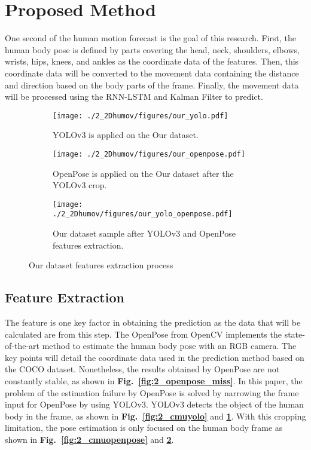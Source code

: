 \section{Proposed Method}\label{2:proposedmethod}
One second of the human motion forecast is the goal of this research. First, the human body pose is defined by parts covering the head, neck, shoulders, elbows, wrists, hips, knees, and ankles as the coordinate data of the features. Then, this coordinate data will be converted to the movement data containing the distance and direction based on the body parts of the frame. Finally, the movement data will be processed using the RNN-LSTM and Kalman Filter to predict.

\begin{figure}
    \centering
    \begin{subfigure}[t]{0.45\textwidth}
        \centering
        \texttt{[image: ./2\_2Dhumov/figures/our\_yolo.pdf]}
        \caption{YOLOv3 is applied on the Our dataset.}
        \label{fig:2_ouryolo}
    \end{subfigure}
    \begin{subfigure}[t]{0.45\textwidth}
        \centering
        \texttt{[image: ./2\_2Dhumov/figures/our\_openpose.pdf]}
        \caption{OpenPose is applied on the Our dataset after the YOLOv3 crop.}
        \label{fig:2_ouropenpose}
    \end{subfigure}
    \begin{subfigure}[t]{0.5\textwidth}
        \centering
        \texttt{[image: ./2\_2Dhumov/figures/our\_yolo\_openpose.pdf]}
        \caption{Our dataset sample after YOLOv3 and OpenPose features extraction.}
        \label{fig:2_ouryoloopenpose}
    \end{subfigure}
    \caption{Our dataset features extraction process}
    \label{fig:2_our_feature_extract}
\end{figure}


\subsection{Feature Extraction}\label{2:proposed_featureextract}
The feature is one key factor in obtaining the prediction as the data that will be calculated are from this step. The OpenPose from OpenCV implements the state-of-the-art method to estimate the human body pose with an RGB camera. The key points will detail the coordinate data used in the prediction method based on the COCO dataset. Nonetheless, the results obtained by OpenPose are not constantly stable, as shown in \textbf{Fig.~\ref{fig:2_openpose_miss}}. In this paper, the problem of the estimation failure by OpenPose is solved by narrowing the frame input for OpenPose by using YOLOv3. YOLOv3 detects the object of the human body in the frame, as shown in \textbf{Fig.~\ref{fig:2_cmuyolo}} and \textbf{ \ref{fig:2_ouryolo}}. With this cropping limitation, the pose estimation is only focused on the human body frame as shown in \textbf{Fig.~\ref{fig:2_cmuopenpose}} and \textbf{ \ref{fig:2_ouropenpose}}.

